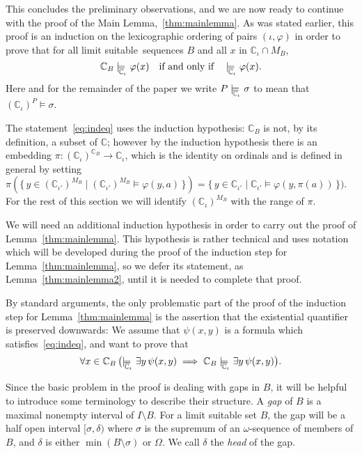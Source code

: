 \documentclass[
twoside,
]{article}
\theoremstyle{definition}
\theoremstyle{remark}
\newcommand{\modelsCi}{\models_{\!\!\!\!\!\lower.7ex\hbox{$\scriptstyle\chang_\iota$}}}\newcommand{\fvia}[4]{f^{#1}_{#2(#3)#4}}
\newcommand{\LS}{limit suitable}
\newcommand{\ords}{\Omega}
\renewcommand{\phi}{\varphi}
\newcommand{\set}[1]{\{\,#1\,\}}
\newcommand\chang{\mathbb{C}}
\begin{document}
\medskip

This concludes the preliminary observations, and 
we are now ready to continue with the proof of the Main 
Lemma,~\ref{thm:mainlemma}.  As was stated earlier, this proof is an
induction on the lexicographic ordering of pairs 
$(\iota, \phi)$ in order to prove that for all  \LS\ sequences $B$ and
all $x$ in $\chang_\iota\cap  M_B$,
\begin{equation}\label{eq:indeq}
  \chang_{B}\modelsCi \phi(x) \quad\text{if and only
    if}\quad \modelsCi\phi(x).
\end{equation}
Here and for the remainder of the paper we write $P\modelsCi\sigma$ to
mean that  $(\chang_{\iota})^{P}\models\sigma$.

The statement~\eqref{eq:indeq} uses the induction hypothesis: $\chang_{B}$ is not, by
its definition, a subset of $\chang$; however by the induction
hypothesis there is an embedding $\pi\colon
(\chang_{\iota})^{\chang_B}\to \chang_{\iota} $, which is the identity
on ordinals and is defined in general  by
setting $\pi(\set{y\in (\chang_{\iota'})^{M_B}\mid
  (\chang_{\iota'})^{M_B}\models \phi(y, a)})=
\set{y\in \chang_{\iota'}\mid
  \chang_{\iota'}\models \phi(y, \pi(a))})$.    For the rest of
this section we will identify $(\chang_{\iota})^{M_B}$ with the range
of $\pi$.

We will need an additional induction hypothesis in order to carry out the
proof of Lemma~\ref{thm:mainlemma}.
This hypothesis is rather
technical and uses notation which will be developed during the proof of the induction
step for Lemma~\ref{thm:mainlemma}, so we defer its statement, as
Lemma~\ref{thm:mainlemma2}, until it is needed to complete that proof.


By standard arguments, the only problematic part of the proof of the induction step
for Lemma~\ref{thm:mainlemma}  is the assertion 
that the existential quantifier is
preserved downwards:   We assume that $\psi(x,y)$ is a formula which
satisfies~\eqref{eq:indeq}, and want to prove that
\begin{equation}\label{eq:existsImplies}
  \forall x\in \chang_{B} \, \bigl(\modelsCi\exists
  y\,\psi(x,y)\implies \chang_{B}\modelsCi\exists y\,\psi(x,y)\bigr).
\end{equation}

Since the basic problem in the proof is dealing with gaps in $B$, it
will be helpful to  introduce some terminology to describe their
structure.   A \emph{gap} of $B$ is a 
maximal nonempty  interval of $I\setminus B$.     
For a \LS{} set $B$, the gap
will be a half open interval $[\sigma,\delta)$ where $\sigma$ is the
supremum of an $\omega$-sequence of members of $B$, and $\delta$ is
either $\min(B\setminus\sigma)$ or $\ords$.     We call $\delta$ the
\emph{head} of the gap.
\end{document}

